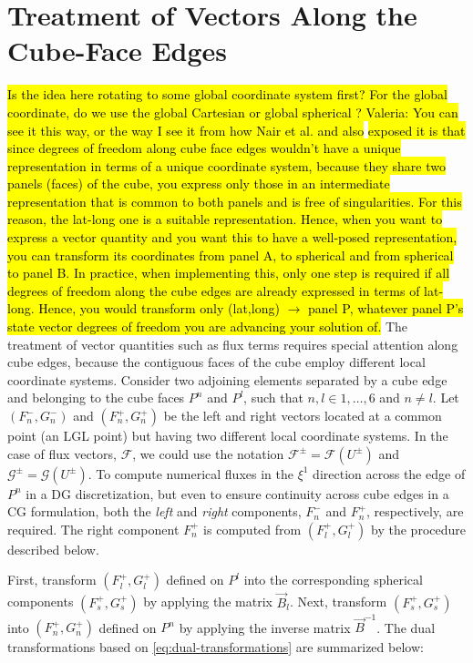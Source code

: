 \documentclass{report}
\begin{document}
\section[Treatment of Vectors Along the Cube-Face Edges]{Treatment of Vectors Along the Cube-Face Edges}
\hl{Is the idea here rotating to some global coordinate system first? 
For the global coordinate, do we use the global Cartesian or global spherical ? Valeria: You can see it this way, or the way I see it from how Nair et al. and also} \citep{Taylor1997} \hl{exposed it is that since degrees of freedom along cube face edges wouldn't have a unique representation in terms of a unique coordinate system, because they share two panels (faces) of the cube, you express only those in an intermediate representation that is common to both panels and is free of singularities. For this reason, the lat-long one is a suitable representation. Hence, when you want to express a vector quantity and you want this to have a well-posed representation, you can transform its coordinates from panel A, to spherical and from spherical to panel B. In practice, when implementing this, only one step is required if all degrees of freedom along the cube edges are already expressed in terms of lat-long. Hence, you would transform only (lat,long) $\rightarrow $ panel P, whatever panel P's state vector degrees of freedom you are advancing your solution of.}
The treatment of vector quantities such as flux terms requires special attention along cube edges, because the contiguous faces of the cube employ different local coordinate systems. Consider two adjoining elements separated by a cube edge and belonging to the cube faces $P^n$ and $P^l$, such that $n, l \in {1, \ldots , 6}$ and $n \neq l$. Let $(F^{-}_n, G^{-}_n)$ and $(F^{+}_n, G^{+}_n)$ be the left and right vectors located at a common point (an LGL point) but having two different local coordinate systems. In the case of flux vectors, $\boldsymbol{\mathcal{F}}$, we could use the notation $\boldsymbol{\mathcal{F}}^{\pm} = \boldsymbol{\mathcal{F}}(U^{\pm})$ and $\boldsymbol{\mathcal{G}}^{\pm} = \boldsymbol{\mathcal{G}}(U^{\pm})$. To compute numerical fluxes in the $\xi^1$ direction across the edge of $P^n$ in a DG discretization, but even to ensure continuity across cube edges in a CG formulation, both the \emph{left} and \emph{right} components, $F^{-}_n$ and $F^{+}_n$, respectively, are required. The right component $F^{+}_n$ is computed from $(F^{+}_l, G^{+}_l)$ by the procedure described below.

First, transform $(F^{+}_l, G^{+}_l)$ defined on $P^l$ into the corresponding spherical components $(F^{+}_s, G^{+}_s)$ by applying the matrix $\vec{B}_l$. Next, transform $(F^{+}_s, G^{+}_s)$ into $(F^{+}_n, G^{+}_n)$ defined on $P^n$ by applying the inverse matrix $\vec{B}^{-1}$. The dual transformations based on \eqref{eq:dual-transformations} are summarized below:
\end{document}
